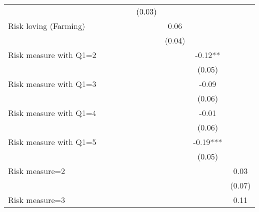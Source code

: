 \begin{table}[htbp]
\begin{threeparttable}
\begin{tabular}{l cccccccc}
                    &               &               &               &               &      (0.03)   &               &               &               \\
Risk loving (Farming)&               &               &               &               &               &        0.06   &               &               \\
                    &               &               &               &               &               &      (0.04)   &               &               \\
Risk measure with Q1=2&               &               &               &               &               &               &       -0.12** &               \\
                    &               &               &               &               &               &               &      (0.05)   &               \\
Risk measure with Q1=3&               &               &               &               &               &               &       -0.09   &               \\
                    &               &               &               &               &               &               &      (0.06)   &               \\
Risk measure with Q1=4&               &               &               &               &               &               &       -0.01   &               \\
                    &               &               &               &               &               &               &      (0.06)   &               \\
Risk measure with Q1=5&               &               &               &               &               &               &       -0.19***&               \\
                    &               &               &               &               &               &               &      (0.05)   &               \\
Risk measure=2      &               &               &               &               &               &               &               &        0.03   \\
                    &               &               &               &               &               &               &               &      (0.07)   \\
Risk measure=3      &               &               &               &               &               &               &               &        0.11   \\

\end{tabular}
\end{threeparttable}
\end{table}
